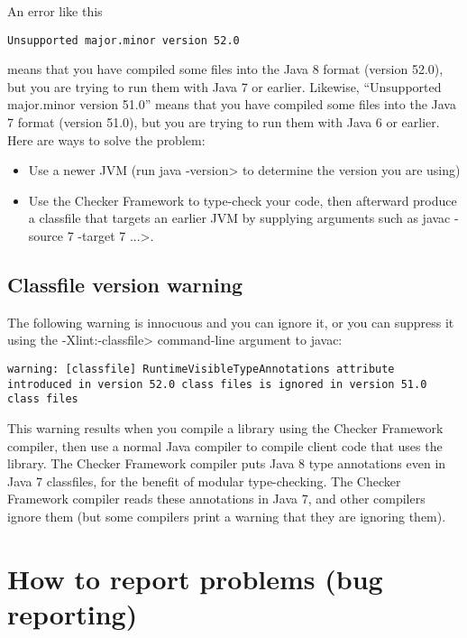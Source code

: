 An error like this

\begin{Verbatim}
Unsupported major.minor version 52.0
\end{Verbatim}

\noindent
means that you have compiled some files into the Java 8 format (version
52.0), but you are trying to run them with Java 7 or earlier.
Likewise, ``Unsupported major.minor version 51.0''
means that you have compiled some files into the Java 7 format (version
51.0), but you are trying to run them with Java 6 or earlier.
Here are ways to solve the problem:

\begin{itemize}
\item
Use a newer JVM (run \<java -version> to
determine the version you are using)
\item
Use the Checker Framework to type-check your code, then afterward produce a
classfile that targets an earlier JVM by supplying arguments such as
\<javac -source 7 -target 7 ...>.
\end{itemize}


\subsection{Classfile version warning\label{common-problems-classfile-version}}

The following warning is innocuous and you can ignore it, or you can
suppress it using the \<-Xlint:-classfile> command-line argument to javac:

\begin{myxsmall}
\begin{Verbatim}
warning: [classfile] RuntimeVisibleTypeAnnotations attribute introduced in version 52.0 class files is ignored in version 51.0 class files
\end{Verbatim}
\end{myxsmall}

This warning results when you compile a library using the Checker Framework
compiler, then use a normal Java compiler to compile client code that uses
the library.
The Checker Framework compiler puts Java 8 type annotations even in Java 7
classfiles, for the benefit of modular type-checking.  The Checker Framework
compiler reads these annotations in Java 7, and other compilers ignore them
(but some compilers print a warning that they are ignoring them).


\section{How to report problems (bug reporting)\label{reporting-bugs}}

